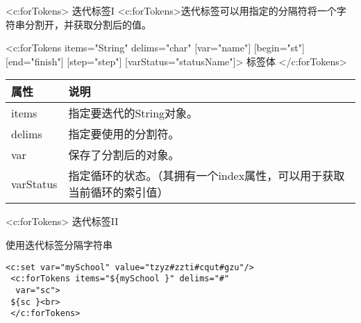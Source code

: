 \documentclass{beamer}
\begin{document}
\begin{frame}{<c:forTokens> 迭代标签I}
<c:forTokens>迭代标签可以用指定的分隔符将一个字符串分割开，并获取分割后的值。

<c:forTokens items="String" delims="char" [var="name"] 
[begin="st"] [end="finish"] [step="step"] [varStatus="statusName"]>
 标签体
 </c:forTokens>
\begin{table}
\begin{tabular}{lp{24em}}
\toprule
\textbf{属性}&\textbf{说明}\\
\midrule
items&指定要迭代的String对象。\\
delims&指定要使用的分割符。\\
var&保存了分割后的对象。\\
varStatus&指定循环的状态。（其拥有一个index属性，可以用于获取当前循环的索引值）\\
\bottomrule
\end{tabular}
\end{table}
\end{frame}

\begin{frame}[fragile]{<c:forTokens> 迭代标签II}
\begin{block}{使用迭代标签分隔字符串}
\begin{lstlisting}
<c:set var="mySchool" value="tzyz#zzti#cqut#gzu"/>
 <c:forTokens items="${mySchool }" delims="#" 
  var="sc">
 ${sc }<br>
 </c:forTokens>
\end{lstlisting}
\end{block}

\end{frame}

\end{document}
